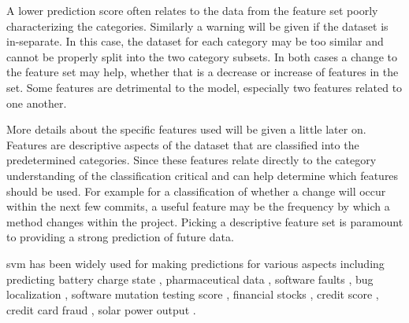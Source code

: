 A lower prediction score often relates to the data from the feature set poorly characterizing the categories. Similarly a warning will be given if the dataset is in-separate. In this case, the dataset for each category may be too similar and cannot be properly split into the two category subsets. In both cases a change to the feature set may help, whether that is a decrease or increase of features in the set. Some features are detrimental to the model, especially two features related to one another.

More details about the specific features used will be given a little later on. Features are descriptive aspects of the dataset that are classified into the predetermined categories. Since these features relate directly to the category understanding of the classification critical and can help determine which features should be used. For example for a classification of whether a change will occur within the next few commits, a useful feature may be the frequency by which a method changes within the project. Picking a descriptive feature set is paramount to providing a strong prediction of future data.


\gls{svm} has been widely used for making predictions for various aspects including predicting battery charge state \cite{Anton2013}, pharmaceutical data \cite{Burbidge2001}, software faults \cite{Gondra2008, Erturk2015, Malhotra2015, Kim2008, Moeyersoms2015, Neuhaus2007}, bug localization \cite{Murphy2007, Neuhaus2007}, software mutation testing score \cite{Jalbert2012}, financial stocks \cite{Kim2003}, credit score \cite{Huang2007}, credit card fraud \cite{Westland2011}, solar power output \cite{Zeng2016}.

